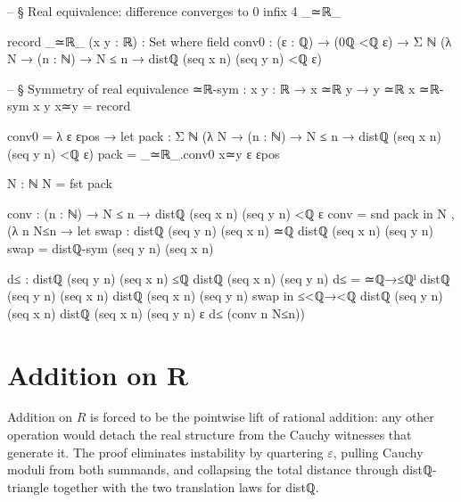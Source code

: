 \documentclass[11pt,a4paper]{book}
\def\mathbb#1{#1}%
\def\texttt#1{#1}%
\def\texorpdfstring#1#2{#2}%
\begin{document}
\begin{code}
-- § Real equivalence: difference converges to 0
infix 4 _≃ℝ_

record _≃ℝ_ (x y : ℝ) : Set where
  field
    conv0 : (ε : ℚ) → (0ℚ <ℚ ε) → Σ ℕ (λ N → (n : ℕ) → N ≤ n → distℚ (seq x n) (seq y n) <ℚ ε)

-- § Symmetry of real equivalence
≃ℝ-sym : {x y : ℝ} → x ≃ℝ y → y ≃ℝ x
≃ℝ-sym {x} {y} x≃y = record
  { conv0 = λ ε εpos →
      let
        pack : Σ ℕ (λ N → (n : ℕ) → N ≤ n → distℚ (seq x n) (seq y n) <ℚ ε)
        pack = _≃ℝ_.conv0 x≃y ε εpos

        N : ℕ
        N = fst pack

        conv : (n : ℕ) → N ≤ n → distℚ (seq x n) (seq y n) <ℚ ε
        conv = snd pack
      in
      N , (λ n N≤n →
        let
          swap : distℚ (seq y n) (seq x n) ≃ℚ distℚ (seq x n) (seq y n)
          swap = distℚ-sym (seq y n) (seq x n)

          d≤ : distℚ (seq y n) (seq x n) ≤ℚ distℚ (seq x n) (seq y n)
          d≤ = ≃ℚ→≤ℚˡ {distℚ (seq y n) (seq x n)} {distℚ (seq x n) (seq y n)} swap
        in
        ≤<ℚ→<ℚ {distℚ (seq y n) (seq x n)} {distℚ (seq x n) (seq y n)} {ε} d≤ (conv n N≤n))
  }
\end{code}


\section{Addition on \texorpdfstring{$\mathbb{R}$}{R}}

Addition on $\mathbb{R}$ is forced to be the pointwise lift of rational addition: any other operation would detach the real structure from the Cauchy witnesses that generate it. The proof eliminates instability by quartering $\varepsilon$, pulling Cauchy moduli from both summands, and collapsing the total distance through \texttt{distℚ-triangle} together with the two translation laws for \texttt{distℚ}.
\end{document}
